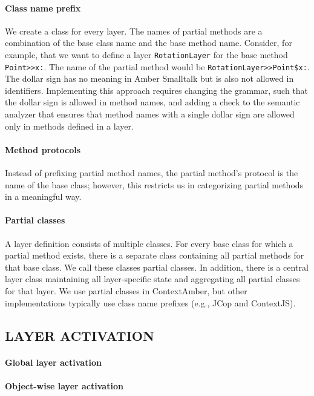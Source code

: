 \documentclass{sig-alternate}
\begin{document}
\paragraph{Class name prefix}
We create a class for every layer. The names of partial methods are a combination of the base class name and the base method name. Consider, for example, that we want to define a layer \texttt{RotationLayer} for the base method \texttt{Point>>x:}. The name of the partial method would be \texttt{RotationLayer>>Point\$x:}. The dollar sign has no meaning in Amber Smalltalk but is also not allowed in identifiers. Implementing this approach requires changing the grammar, such that the dollar sign is allowed in method names, and adding a check to the semantic analyzer that ensures that method names with a single dollar sign are allowed only in methods defined in a layer.

\paragraph{Method protocols}
Instead of prefixing partial method names, the partial method's protocol is the name of the base class; however, this restricts us in categorizing partial methods in a meaningful way.

\paragraph{Partial classes}
A layer definition consists of multiple classes. For every base class for which a partial method exists, there is a separate class containing all partial methods for that base class. We call these classes partial classes. In addition, there is a central layer class maintaining all layer-specific state and aggregating all partial classes for that layer. We use partial classes in ContextAmber, but other implementations typically use class name prefixes (e.g., JCop and ContextJS).

\subsection{LAYER ACTIVATION}

\paragraph{Global layer activation}

\paragraph{Object-wise layer activation}
\end{document}
